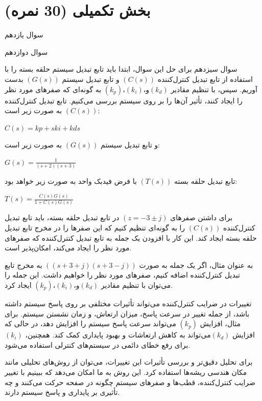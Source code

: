\documentclass{article}
\begin{document}
\raggedleft
\section{ بخش تکمیلی (30 نمره)}

\begin{problem}{سوال یازدهم}
	
\end{problem}



\begin{problem}{سوال دوازدهم}
	
\end{problem}



\begin{problem}{سوال سیزدهم}
	برای حل این سوال، ابتدا باید تابع تبدیل سیستم حلقه بسته را با استفاده از تابع تبدیل کنترل‌کننده $( C(s) )$ و تابع تبدیل سیستم $( G(s) )$ بدست آوریم. سپس، با تنظیم مقادیر $( k_p )، ( k_i )، و ( k_d )$ به گونه‌ای که صفرهای مورد نظر را ایجاد کنند، تأثیر آن‌ها را بر روی سیستم بررسی می‌کنیم.
	تابع تبدیل کنترل‌کننده $( C(s) )$ به صورت زیر است:
	
	\raggedleft
	
	$C(s)=kp​+ski​​+kd​s$
	
	\raggedright
	
	و تابع تبدیل سیستم $( G(s) )$ به صورت زیر است:
	
	\raggedleft
	$G(s)=\frac{1}{(s+2)(s+3)}$
	
	\raggedright
	
	تابع تبدیل حلقه بسته $( T(s) )$ با فرض فیدبک واحد به صورت زیر خواهد بود:
	
	\raggedleft
	$T(s)=\frac{C(s)G(s)}{1+C(s)G(s)}$
	
	\raggedright
	
	برای داشتن صفرهای $( z = -3 \pm j )$ در تابع تبدیل حلقه بسته، باید تابع تبدیل کنترل‌کننده $( C(s) )$ را به گونه‌ای تنظیم کنیم که این صفرها را در مخرج تابع تبدیل حلقه بسته ایجاد کند. این کار با افزودن یک جمله به تابع تبدیل کنترل‌کننده که صفرهای مورد نظر را ایجاد می‌کند، امکان‌پذیر است.
	
	به عنوان مثال، اگر یک جمله به صورت $( (s + 3 + j)(s + 3 - j) )$ به مخرج تابع تبدیل کنترل‌کننده اضافه کنیم، صفرهای مورد نظر را خواهیم داشت. این جمله را می‌توان با تنظیم مقادیر $( k_p )،( k_i )، و ( k_d )$ ایجاد کرد.
	
	تغییرات در ضرایب کنترل‌کننده می‌تواند تأثیرات مختلفی بر روی پاسخ سیستم داشته باشد، از جمله تغییر در سرعت پاسخ، میزان ارتعاش، و زمان نشستن سیستم. برای مثال، افزایش $( k_p )$ می‌تواند سرعت پاسخ سیستم را افزایش دهد، در حالی که افزایش $( k_d ) $می‌تواند به کاهش ارتعاشات و بهبود پایداری کمک کند. همچنین، $( k_i )$ برای رفع خطای دائمی در سیستم‌های کنترلی استفاده می‌شود.
	
	برای تحلیل دقیق‌تر و بررسی تأثیرات این تغییرات، می‌توان از روش‌های تحلیلی مانند مکان هندسی ریشه‌ها استفاده کرد. این روش به ما امکان می‌دهد که ببینیم با تغییر ضرایب کنترل‌کننده، قطب‌ها و صفرهای سیستم چگونه در صفحه  حرکت می‌کنند و چه تأثیری بر پایداری و پاسخ سیستم دارند.
	
	
\end{problem}
\end{document}
